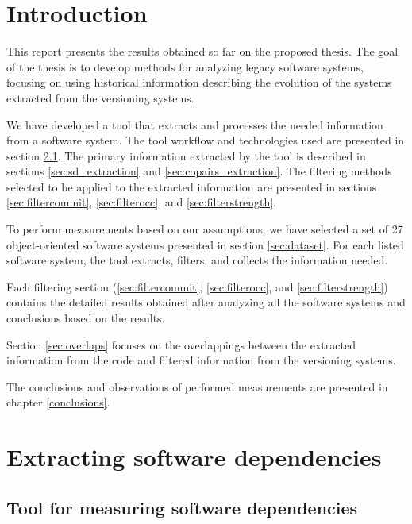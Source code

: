 \documentclass[12pt]{mitthesis}
\begin{document}


\tableofcontents

\pagestyle{plain}


\chapter{Introduction}


This report presents the results obtained so far on the proposed thesis. The goal of the thesis is to develop methods for analyzing legacy software systems, focusing on using historical information describing the evolution of the systems extracted from the versioning systems.

We have developed a tool that extracts and processes the needed information from a software system. The tool workflow and technologies used are presented in section \ref{sec:tool}. The primary information extracted by the tool is described in sections \ref{sec:sd_extraction} and \ref{sec:copairs_extraction}. The filtering methods selected to be applied to the extracted information are presented in sections \ref{sec:filtercommit}, \ref{sec:filterocc}, and \ref{sec:filterstrength}.

To perform measurements based on our assumptions, we have selected a set of 27 object-oriented software systems presented in section \ref{sec:dataset}. 
For each listed software system, the tool extracts, filters, and collects the information needed.

Each filtering section (\ref{sec:filtercommit}, \ref{sec:filterocc}, and \ref{sec:filterstrength}) contains the detailed results obtained after analyzing all the software systems and conclusions based on the results. 

Section \ref{sec:overlaps} focuses on the overlappings between the extracted information from the code and filtered information from the versioning systems. 

The conclusions and observations of performed measurements are presented in chapter \ref{conclusions}.






\chapter{Extracting software dependencies}
\label{extraction}

\section{Tool for measuring software dependencies}
\label{sec:tool}
\end{document}
